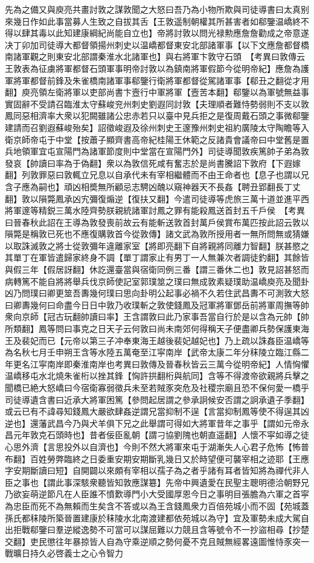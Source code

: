 先為之備又與庾亮共畫討敦之謀敦聞之大怒曰吾乃為小物所欺與司徒導書曰太真别來幾日作如此事當募人生致之自拔其舌【王敦遥制朝權其所甚害者如郗鑒温嶠終不得以肆其毒以此知建康綱紀尚能自立也】帝將討敦以問光禄勲應詹詹勸成之帝意遂决丁卯加司徒導大都督領揚州刺史以温嶠都督東安北部諸軍事【以下文應詹都督橋南諸軍觀之則東安北部謂秦淮水北諸軍也】與右將軍卞敦守石頭　【考異曰敦傳云王敦表為征虜將軍都督石頭軍事明帝討敦以為鎮南將軍假節今從明帝紀】應詹為護軍將軍都督前鋒及朱雀橋南諸軍事郗鑒行衛將軍都督從駕諸軍事【郗丑之翻從才用翻】庾亮領左衛將軍以吏部尚書卞壼行中軍將軍【壼苦本翻】郗鑒以為軍號無益事實固辭不受請召臨淮太守蘇峻兖州刺史劉遐同討敦【夫理順者難恃勢弱則不支以敦鳳同惡相濟率大衆以犯闕雖諸公忠赤若只以臺中見兵拒之是復周戴石頭之事微郗鑒建請而召劉遐蘇峻殆矣】詔徵峻遐及徐州刺史王邃豫州刺史祖約廣陵太守陶瞻等入衛京師帝屯于中堂【按蕭子顯齊書高帝紀桂陽王休範之反諸貴會議帝曰中堂舊是置兵地領軍宜屯宣陽門為諸軍節度則中堂當在宣陽門外】司徒導聞敦疾篤帥子弟為敦發哀【帥讀曰率為于偽翻】衆以為敦信死咸有奮志於是尚書騰詔下敦府【下遐嫁翻】列敦罪惡曰敦輒立兄息以自承代未有宰相繼體而不由王命者也【息子也謂以兄含子應為嗣也】頑凶相奬無所顧忌志騁凶醜以窺神器天不長姦【聘丑郢翻長丁丈翻】敦以隕斃鳳承凶宄彌復煽逆【復扶又翻】今遣司徒導等虎旅三萬十道並進平西將軍邃等精鋭三萬水陸齊勢朕親統諸軍討鳳之罪有能殺鳳送首封五千戶侯　【考異曰晉春秋此詔在王導為敦發喪前故云有能斬送敦首封萬戶侯賞布萬匹按此詔云敦以隕斃是稱敦已死也不應復購敦首今從敦傳】諸文武為敦所授用者一無所問無或猜嫌以取誅滅敦之將士從敦彌年違離家室【將即亮翻下自將親將同離力智翻】朕甚愍之其單丁在軍皆遣歸家終身不調【單丁謂家止有男丁一人無兼次者調徒釣翻】其餘皆與假三年【假居訝翻】休訖還臺當與宿衛同例三番【謂三番休二也】敦見詔甚怒而病轉篤不能自將將舉兵伐京師使記室郭璞筮之璞曰無成敦素疑璞助温嶠庾亮及聞卦凶乃問璞曰卿更筮吾夀幾何璞曰思向卦明公起事必禍不久若住武昌夀不可測敦大怒曰卿夀幾何曰命盡今日日中敦乃收璞斬之敦使錢鳳及冠軍將軍鄧岳前將軍周撫等帥衆向京師【冠古玩翻帥讀曰率】王含謂敦曰此乃家事吾當自行於是以含為元帥【帥所類翻】鳳等問曰事克之日天子云何敦曰尚未南郊何得稱天子便盡卿兵勢保護東海王及裴妃而已【元帝以第三子冲奉東海王越後裴妃越妃也】乃上疏以誅姦臣温嶠等為名秋七月壬申朔王含等水陸五萬奄至江寜南岸【武帝太康二年分秣陵立臨江縣二年更名江寜南岸即秦淮南岸也考異曰敦傳及晉春秋皆云三萬今從明帝紀】人情恟懼温嶠移屯水北燒朱雀桁以挫其鋒【恟許拱翻桁與航同】含等不得渡帝欲親將兵擊之聞橋已絶大怒嶠曰今宿衛寡弱徵兵未至若賊豕突危及社稷宗廟且恐不保何愛一橋乎司徒導遺含書曰近承大將軍困篤【參問起居謂之參承詗候安否謂之詗承遺子季翻】或云已有不諱尋知錢鳳大嚴欲肆姦逆謂兄當抑制不逞【言當抑制鳳等使不得逞其凶逆也】還藩武昌今乃與犬羊俱下兄之此舉謂可得如大將軍昔年之事乎【謂如元帝永昌元年敦克石頭時也】昔者佞臣亂朝【謂刁協劉隗也朝直遥翻】人懷不寜如導之徒心思外濟【言思投外以自濟也】今則不然大將軍來屯于湖漸失人心君子危怖【怖普布翻】百姓勞弊臨終之日委重安期安期斷乳幾日又於時望便可襲宰相之迹耶【王應字安期斷讀曰短】自開闢以來頗有宰相以孺子為之者乎諸有耳者皆知將為禪代非人臣之事也【謂此事深駭衆聽皆知敦應謀簒】先帝中興遺愛在民聖主聰明德洽朝野兄乃欲妄萌逆節凡在人臣誰不憤歎導門小大受國厚恩今日之事明目張膽為六軍之首寜為忠臣而死不為無賴而生矣含不答或以為王含錢鳳衆力百倍苑城小而不固【苑城蓋孫氏都秣陵所築晉置建康於秣陵水北南渡建都依苑城以為守】宜及軍勢未成大駕自出拒戰郗鑒曰羣逆縱逸勢不可當可以謀屈難以力競且含等號令不一抄盜相尋【抄楚交翻】吏民懲往年暴掠皆人自為守乘逆順之勢何憂不克且賊無經畧遠圖惟恃豕突一戰曠日持久必啓義士之心令智力